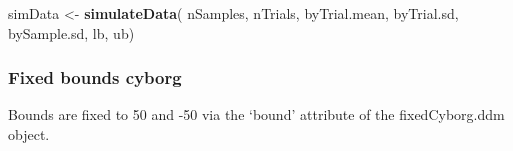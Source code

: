 \documentclass[
]{book}
\newenvironment{Shaded}{\begin{snugshade}}{\end{snugshade}}
\newcommand{\FunctionTok}[1]{\textcolor[rgb]{0.13,0.29,0.53}{\textbf{#1}}}
\newcommand{\NormalTok}[1]{#1}
\newcommand{\OtherTok}[1]{\textcolor[rgb]{0.56,0.35,0.01}{#1}}
\begin{document}
\begin{Shaded}
\begin{Highlighting}[]
\NormalTok{simData }\OtherTok{\textless{}{-}} \FunctionTok{simulateData}\NormalTok{(}
\NormalTok{  nSamples,}
\NormalTok{  nTrials,}
\NormalTok{  byTrial.mean,}
\NormalTok{  byTrial.sd,}
\NormalTok{  bySample.sd,}
\NormalTok{  lb,}
\NormalTok{  ub)}
\end{Highlighting}
\end{Shaded}

\hypertarget{fixed-bounds-cyborg}{%
\subsubsection*{Fixed bounds cyborg}\label{fixed-bounds-cyborg}}

Bounds are fixed to 50 and -50 via the `bound' attribute of the fixedCyborg.ddm object.
\end{document}
